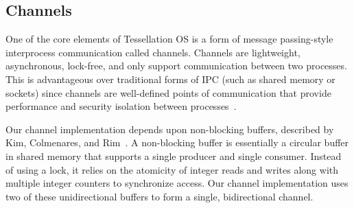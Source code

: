 \documentclass[letterpaper,twocolumn,11pt]{article}
\begin{document}
%
%

\subsection{Channels}

One of the core elements of Tessellation OS is a form of message passing-style interprocess communication called channels.
Channels are lightweight, asynchronous, lock-free, and only support communication between two processes. This is advantageous over traditional forms of IPC (such as shared memory or sockets) since channels are well-defined points of communication that provide performance and security isolation between processes~\cite{tessellation-hotpar10}.

Our channel implementation depends upon non-blocking buffers, described by Kim, Colmenares, and Rim~\cite{Kim:2007:EAN:1260991.1261857}. A non-blocking buffer is essentially a circular buffer in shared memory that supports a single producer and single consumer. Instead of using a lock, it relies on the atomicity of integer reads and writes along with multiple integer counters to synchronize access. Our channel implementation uses two of these unidirectional buffers to form a single, bidirectional channel.
\end{document}
